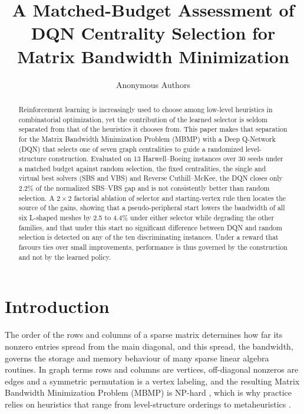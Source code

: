 \documentclass[runningheads]{llncs}
\title{A Matched-Budget Assessment of DQN Centrality Selection for Matrix Bandwidth Minimization}
\author{Anonymous Authors}
\institute{Affiliation omitted for review}
\begin{document}
\raggedbottom
\maketitle

\begin{abstract}
Reinforcement learning is increasingly used to choose among low-level heuristics in combinatorial optimization, yet the contribution of the learned selector is seldom separated from that of the heuristics it chooses from. This paper makes that separation for the Matrix Bandwidth Minimization Problem (MBMP) with a Deep Q-Network (DQN) that selects one of seven graph centralities to guide a randomized level-structure construction. Evaluated on 13 Harwell--Boeing instances over 30 seeds under a matched budget against random selection, the fixed centralities, the single and virtual best solvers (SBS and VBS) and Reverse Cuthill--McKee, the DQN closes only 2.2\% of the normalized SBS--VBS gap and is not consistently better than random selection. A $2\times2$ factorial ablation of selector and starting-vertex rule then locates the source of the gains, showing that a pseudo-peripheral start lowers the bandwidth of all six L-shaped meshes by 2.5 to 4.4\% under either selector while degrading the other families, and that under this start no significant difference between DQN and random selection is detected on any of the ten discriminating instances. Under a reward that favours ties over small improvements, performance is thus governed by the construction and not by the learned policy.

\end{abstract}

\section{Introduction}

The order of the rows and columns of a sparse matrix determines how far its nonzero entries spread from the main diagonal, and this spread, the bandwidth, governs the storage and memory behaviour of many sparse linear algebra routines. In graph terms rows and columns are vertices, off-diagonal nonzeros are edges and a symmetric permutation is a vertex labeling, and the resulting Matrix Bandwidth Minimization Problem (MBMP) is NP-hard \cite{papadimitriou1976}, which is why practice relies on heuristics that range from level-structure orderings \cite{cuthill1969,gibbs1976} to metaheuristics \cite{marti2001,pinana2004,rodriguez2008,mladenovic2010}.
\end{document}
